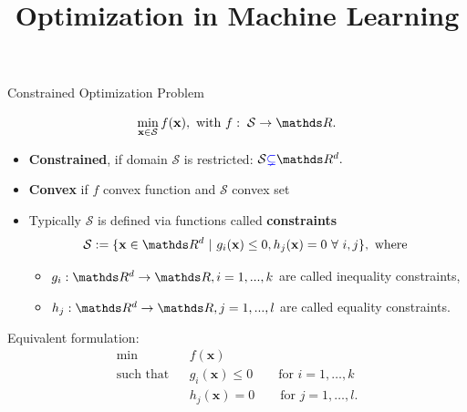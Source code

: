 \documentclass[11pt,compress,t,notes=noshow, xcolor=table]{beamer}
\title{Optimization in Machine Learning}
\date{}
\begin{document}
\sloppy

\begin{vbframe}{Constrained Optimization Problem }

$$
\min_{\xv \in \mathcal{S}} \fx, \text{ with } f: \; \mathcal{S} \to \R.
$$

\begin{itemize}
	\item \textbf{Constrained}, if domain $\mathcal{S}$ is restricted: $\mathcal{S} \textcolor{blue}{\subsetneq} \R^d.$

\item \textbf{Convex} if $f$ convex function and $\mathcal{S}$ convex set

	\item Typically $\mathcal{S}$ is defined via functions called \textbf{constraints}
	$$
		\mathcal{S}:= \{\xv \in \R^d ~|~ g_i(\xv) \le 0, h_j(\xv) = 0 ~\forall~ i, j\}, \text{ where }
	$$ 

\begin{itemize}
\item $g_i: \R^d \to \R, i = 1, ..., k$ are called inequality constraints,
\item $h_j: \R^d \to \R, j = 1, ..., l$ are called equality constraints.
\end{itemize}

\end{itemize}

\lz 

Equivalent formulation: 
\begin{eqnarray*}
\min && f(\mathbf{x})  \\
\text{such that} && g_i(\mathbf{x}) \le 0 \qquad \text{for } i=1,\ldots,k  \\
 && h_j(\mathbf{x}) = 0 \qquad \text{for } j=1,\ldots,l. 
\end{eqnarray*}

\end{vbframe}
\end{document}
